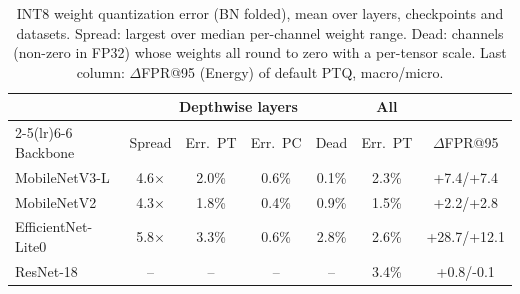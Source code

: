 \begin{table}[t]
\centering
\caption{INT8 weight quantization error (BN folded), mean over layers, checkpoints and datasets. Spread: largest over median per-channel weight range. Dead: channels (non-zero in FP32) whose weights all round to zero with a per-tensor scale. Last column: $\Delta$FPR@95 (Energy) of default PTQ, macro/micro.}
\label{tab:weights}
\setlength{\tabcolsep}{2.6pt}
\footnotesize
\begin{tabular}{l cccc c c}
\toprule
 & \multicolumn{4}{c}{Depthwise layers} & All & \\
\cmidrule(lr){2-5}\cmidrule(lr){6-6}
Backbone & Spread & Err.\ PT & Err.\ PC & Dead & Err.\ PT & $\Delta$FPR@95 \\
\midrule
MobileNetV3-L & 4.6$\times$ & 2.0\% & 0.6\% & 0.1\% & 2.3\% & +7.4/+7.4 \\
MobileNetV2 & 4.3$\times$ & 1.8\% & 0.4\% & 0.9\% & 1.5\% & +2.2/+2.8 \\
EfficientNet-Lite0 & 5.8$\times$ & 3.3\% & 0.6\% & 2.8\% & 2.6\% & +28.7/+12.1 \\
ResNet-18 & -- & -- & -- & -- & 3.4\% & +0.8/-0.1 \\
\bottomrule
\end{tabular}
\end{table}